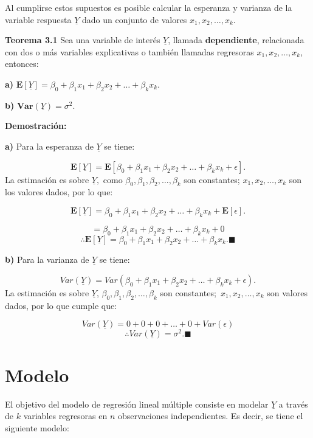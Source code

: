 \documentclass[
  a4paper,
  oneside,
  openany]{book}
\begin{document}
Al cumplirse estos supuestos es posible calcular la esperanza y varianza de la variable respuesta \(\underline{Y}\) dado un conjunto de valores \(x_{1},x_{2},\ldots,x_{k}.\)

\textbf{Teorema 3.1} Sea una variable de interés \(\underline{Y}\), llamada \textbf{dependiente}, relacionada con dos o más variables explicativas o también llamadas regresoras \(x_{1},x_{2},\ldots,x_{k}\),
entonces:

\textbf{a)} \(\mathbf{E}[\underline{Y}]= \beta_{0}+\beta_{1}x_{1}+\beta_{2}x_{2}+ \ldots + \beta_{k}x_{k}.\)

\textbf{b)} \(\textbf{Var}(\underline{Y})= \sigma^2.\)

\textbf{Demostración:}

\textbf{a)} Para la esperanza de \(\underline{Y}\) se tiene:

\[\mathbf{E}[\underline{Y}]=\mathbf{E}[\beta_{0}+\beta_{1}x_{1}+\beta_{2}x_{2}+ \ldots +\beta_{k}x_{k}+\epsilon].\]
La estimación es sobre \(\underline{Y},\)
como \(\beta_{0},\beta_{1},\beta_{2},\ldots,\beta_{k}\) son constantes; \(x_{1},x_{2}, \ldots,x_{k}\) son los valores dados, por lo que:

\[\mathbf{E}[\underline{Y}]=\beta_{0}+\beta_{1}x_{1}+\beta_{2}x_{2}+ \ldots +\beta_{k}x_{k}+\mathbf{E}[\epsilon].\]

\[=\beta_{0}+\beta_{1}x_{1}+\beta_{2}x_{2}+ \ldots +\beta_{k}x_{k}+0\]
\[\therefore \mathbf{E}[\underline{Y}]= \beta_{0}+\beta_{1}x_{1}+\beta_{2}x_{2}+ \ldots + \beta_{k}x_{k}. \blacksquare\]

\textbf{b)} Para la varianza de \(\underline{Y}\) se tiene:

\[Var(\underline{Y})=Var\left( \beta_{0}+\beta_{1}x_{1}+\beta_{2}x_{2}+ \ldots + \beta_{k}x_{k}+ \epsilon\right).\]
La estimación es sobre \(\underline{Y}\), \(\beta_{0},\beta_{1},\beta_{2},\ldots,\beta_{k}\) son constantes;~\(x_{1},x_{2},\ldots,x_{k}\) son valores dados, por lo que cumple que:

\[Var(\underline{Y})=0+0+0+\ldots+0+Var(\epsilon)\]
\[\therefore Var(\underline{Y})=\sigma^2.\blacksquare\]

\hypertarget{modelo}{%
\chapter{Modelo}\label{modelo}}

El objetivo del modelo de regresión lineal múltiple consiste en modelar \(\underline{Y}\) a través de \(k\) variables regresoras en \(n\) observaciones independientes. Es decir, se tiene el siguiente modelo:
\end{document}
